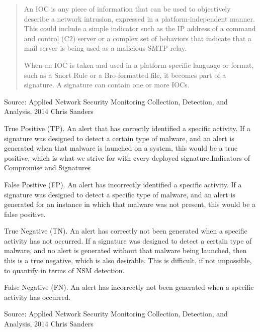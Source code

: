 \documentclass[Screen16to9,17pt]{foils}
\begin{document}

\begin{quote}
An IOC is any piece of information that can be used to objectively describe a
network intrusion, expressed in a platform-independent manner. This could include a simple indicator such as the IP address of a command and control (C2) server or a complex set of behaviors that indicate that a mail server is being used as a malicious SMTP relay.

When an IOC is taken and used in a platform-specific language or format, such as a Snort Rule or a Bro-formatted file, it becomes part of a signature. A signature can contain one or more IOCs.
\end{quote}

Source: Applied Network Security Monitoring Collection, Detection, and Analysis, 2014 Chris Sanders


\begin{list2}
\item True Positive (TP). An alert that has correctly identified a specific activity. If a signature was designed to detect a certain type of malware, and an alert is generated when that malware is launched on a system, this would be a true positive, which is what we strive for with every deployed signature.Indicators of Compromise and Signatures
\item False Positive (FP). An alert has incorrectly identified a specific activity. If a signature was designed to detect a specific type of malware, and an alert is generated for an instance in which that malware was not present, this would be a false positive.
\item True Negative (TN). An alert has correctly not been generated when a specific activity has not occurred. If a signature was designed to detect a certain type of malware, and no alert is generated without that malware being launched, then this is a true negative, which is also desirable. This is difficult, if not impossible, to quantify in terms of NSM detection.
\item False Negative (FN). An alert has incorrectly not been generated when a specific activity has occurred.
\end{list2}

Source: Applied Network Security Monitoring Collection, Detection, and Analysis, 2014 Chris Sanders

\end{document}
